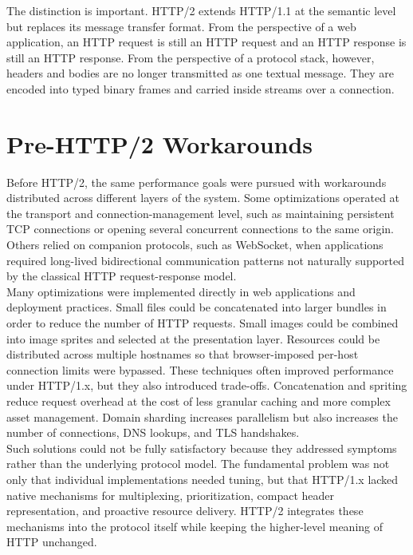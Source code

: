 \documentclass{scrbook}
\begin{document}
The distinction is important. HTTP/2 extends HTTP/1.1 at the semantic level but replaces its message transfer format. From the perspective of a web application, an HTTP request is still an HTTP request and an HTTP response is still an HTTP response. From the perspective of a protocol stack, however, headers and bodies are no longer transmitted as one textual message. They are encoded into typed binary frames and carried inside streams over a connection.

\section{Pre-HTTP/2 Workarounds}

Before HTTP/2, the same performance goals were pursued with workarounds distributed across different layers of the system. Some optimizations operated at the transport and connection-management level, such as maintaining persistent TCP connections or opening several concurrent connections to the same origin. Others relied on companion protocols, such as WebSocket, when applications required long-lived bidirectional communication patterns not naturally supported by the classical HTTP request-response model.\\

Many optimizations were implemented directly in web applications and deployment practices. Small files could be concatenated into larger bundles in order to reduce the number of HTTP requests. Small images could be combined into image sprites and selected at the presentation layer. Resources could be distributed across multiple hostnames so that browser-imposed per-host connection limits were bypassed. These techniques often improved performance under HTTP/1.x, but they also introduced trade-offs. Concatenation and spriting reduce request overhead at the cost of less granular caching and more complex asset management. Domain sharding increases parallelism but also increases the number of connections, DNS lookups, and TLS handshakes.\\

Such solutions could not be fully satisfactory because they addressed symptoms rather than the underlying protocol model. The fundamental problem was not only that individual implementations needed tuning, but that HTTP/1.x lacked native mechanisms for multiplexing, prioritization, compact header representation, and proactive resource delivery. HTTP/2 integrates these mechanisms into the protocol itself while keeping the higher-level meaning of HTTP unchanged.
\end{document}

